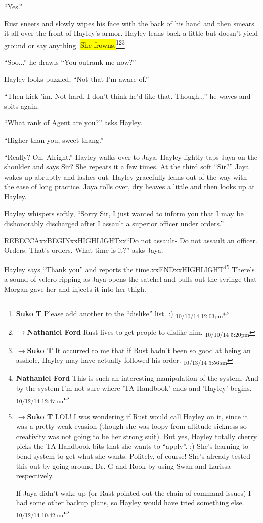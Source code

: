 ``Yes.''

Rust sneers and slowly wipes his face with the back of his hand and then smears it all over the front of Hayley's armor.  Hayley leans back a little but doesn't yield ground or say anything.  \hl{She frowns.}\footnote{\textbf{Suko T }Please add another to the ``dislike'' list. :) \textsubscript{10/10/14 12:03pm}}\footnote{$\rightarrow$\textbf{Nathaniel Ford }Rust lives to get people to dislike him. \textsubscript{10/10/14 5:20pm}}\footnote{$\rightarrow$\textbf{Suko T }It occurred to me that if Rust hadn't been so good at being an asshole, Hayley may have actually followed his order. \textsubscript{10/13/14 3:56am}}

``Soo...'' he drawls ``You outrank me now?''

Hayley looks puzzled, ``Not that I'm aware of.''

``Then kick 'im.  Not hard.  I don't think he'd like that.  Though...''  he waves and spits again.

``What rank of Agent are you?'' asks Hayley.

``Higher than you, sweet thang.''

``Really?  Oh.  Alright.''  Hayley walks over to Jaya.  Hayley lightly taps Jaya on the shoulder and says Sir?  She repeats it a few times.  At the third soft ``Sir?'' Jaya wakes up abruptly and lashes out.  Hayley gracefully leans out of the way with the ease of long practice.  Jaya rolls over, dry heaves a little and then looks up at Hayley.

Hayley whispers softly, ``Sorry Sir, I just wanted to inform you that I may be dishonorably discharged after I assault a superior officer under orders.''

REBECCAxxBEGINxxHIGHLIGHTxx``Do not assault-  Do not assault an officer.  Orders.  That's orders.  What time is it?'' asks Jaya.

Hayley says ``Thank you'' and reports the time.xxENDxxHIGHLIGHT\footnote{\textbf{Nathaniel Ford }This is such an interesting manipulation of the system. And by the system I'm not sure where 'TA Handbook' ends and 'Hayley' begins. \textsubscript{10/12/14 12:47pm}}\footnote{$\rightarrow$\textbf{Suko T }LOL!  I was wondering if Rust would call Hayley on it, since it was a pretty weak evasion (though she was loopy from altitude sickness so creativity was not going to be her strong suit).  But yes, Hayley totally cherry picks the TA Handbook bits that she wants to ``apply''. :)  She's learning to bend system to get what she wants.  Politely, of course!  She's already tested this out by going around Dr. G and Rook by using Swan and Larissa respectively.  

If Jaya didn't wake up (or Rust pointed out the chain of command issues) I had some other backup plans, so Hayley would have tried something else. \textsubscript{10/12/14 10:42pm}}  There's a sound of velcro ripping as Jaya opens the satchel and pulls out the syringe that Morgan gave her and injects it into her thigh. 

